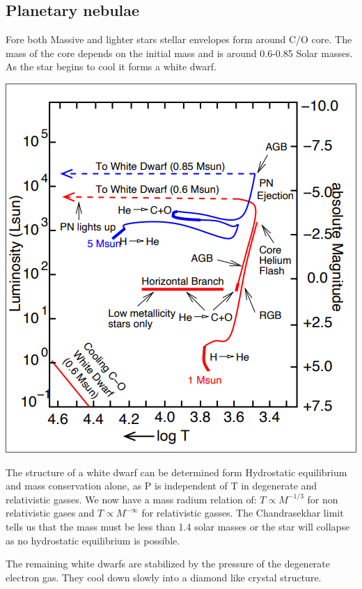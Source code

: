 \documentclass[11pt,a4paper]{article}
\begin{document}
\subsection{Planetary nebulae}
Fore both Massive and lighter stars stellar envelopes form around C/O core. 
The mass of the core depends on the initial mass and is around 0.6-0.85 Solar masses.
As the star begins to cool it forms a white dwarf. 
\begin{center}
    \includegraphics[width=0.5\linewidth]{screenshot_2024-01-23-125950.png}
\end{center}
The structure of a white dwarf can be determined form Hydrostatic equilibrium and mass conservation alone, as P is independent of T in degenerate and relativistic gasses. 
We now have a mass radium relation of: $T \propto M^{-1/3} $ for non relativistic gases and $T \propto M^{-\infty} $ for relativistic gasses.
The Chandrasekhar limit tells us that the mass must be less than 1.4 solar masses or the star will collapse as no hydrostatic equilibrium is possible.

The remaining white dwarfs are stabilized by the pressure of the degenerate electron gas. 
They cool down slowly into a diamond like crystal structure.
\end{document}
